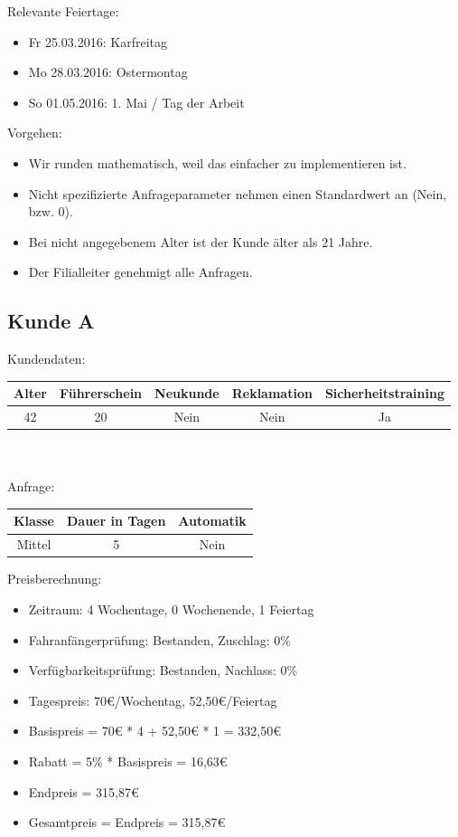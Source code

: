 Relevante Feiertage:
\begin{itemize}
	\item Fr 25.03.2016: Karfreitag
	\item Mo 28.03.2016: Ostermontag
	\item So 01.05.2016: 1. Mai / Tag der Arbeit
\end{itemize}

Vorgehen:
\begin{itemize}
	\item Wir runden mathematisch, weil das einfacher zu implementieren ist.
	\item Nicht spezifizierte Anfrageparameter nehmen einen Standardwert an (Nein, bzw. 0).
	\item Bei nicht angegebenem Alter ist der Kunde älter als 21 Jahre.
	\item Der Filialleiter genehmigt alle Anfragen.
\end{itemize}

\subsection{Kunde A}

Kundendaten:\\
\begin{tabular}{|c|c|c|c|c|}
	\hline \textbf{Alter} & \textbf{Führerschein} & \textbf{Neukunde} & \textbf{Reklamation} & \textbf{Sicherheitstraining} \\ 
	\hline 42 & 20 & Nein & Nein & Ja \\ 
	\hline 
\end{tabular} 
\\\\
Anfrage:\\
\begin{tabular}{|c|c|c|}
	\hline \textbf{Klasse} & \textbf{Dauer in Tagen} & \textbf{Automatik} \\ 
	\hline Mittel & 5 & Nein \\ 
	\hline 
\end{tabular}

\vspace{12pt}
Preisberechnung:
\begin{itemize}
	\item Zeitraum: 4 Wochentage, 0 Wochenende, 1 Feiertag
	\item Fahranfängerprüfung: Bestanden, Zuschlag: 0\%
	\item Verfügbarkeitsprüfung: Bestanden, Nachlass: 0\%
	\item Tagespreis: 70€/Wochentag, 52,50€/Feiertag
	\item Basispreis = 70€ * 4 + 52,50€ * 1 = 332,50€
	\item Rabatt = 5\% * Basispreis = 16,63€
	\item Endpreis = 315,87€
	\item Gesamtpreis = Endpreis = 315,87€
\end{itemize}


